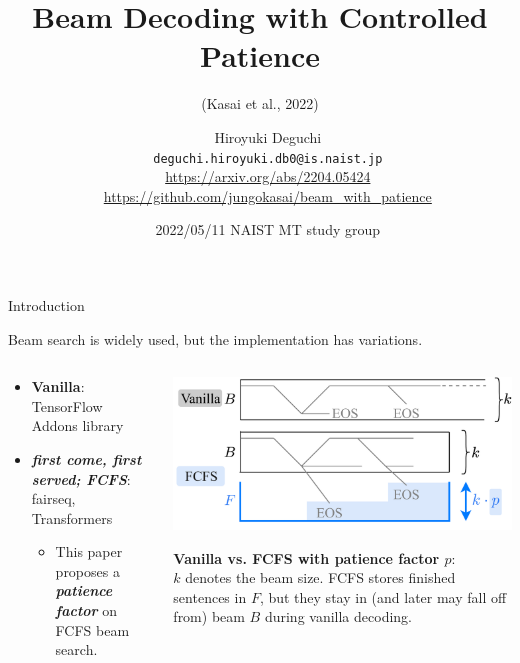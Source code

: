 \documentclass[t, unicode, 12pt, xdvipdfmx, aspectratio=169, bxjsarticle]{beamer}
\author{\mbox{\lower2.0pt\hbox{\materials}}~ Hiroyuki Deguchi \\ \mbox{\lower2.0pt\hbox{\materials}}~ \texttt{deguchi.hiroyuki.db0@is.naist.jp} \\ \raise0.5pt\hbox{\octicons}~ \url{https://arxiv.org/abs/2204.05424} \\ \raise0.5pt\hbox{\octicons}~ \url{https://github.com/jungokasai/beam_with_patience}}
\date{\mbox{\lower2.0pt\hbox{\materials}}~ 2022/05/11 NAIST MT study group}
\title{Beam Decoding with Controlled Patience}
\subtitle{(Kasai et al., 2022)}
\institute{}
\begin{document}
\maketitle

\begin{frame}[label={sec:orgd1eb8cc}]{Introduction}
\begin{block}{Beam search is widely used, but the implementation has variations.}
\begin{columns}
\begin{column}{0.5\columnwidth}
\begin{itemize}
\item \textbf{Vanilla}: TensorFlow Addons library
\item \textbf{\textit{first come, first served; FCFS}}: fairseq, Transformers
\begin{itemize}
\item This paper proposes a \textbf{\textit{patience factor}} on FCFS beam search.
\end{itemize}
\end{itemize}
\end{column}

\begin{column}{0.5\columnwidth}
\begin{center}
\includegraphics[width=1.0\linewidth]{./figure/contrast_fig.pdf}
\end{center}

\footnotesize \textbf{Vanilla vs. FCFS with patience factor $p$}: \\
\(k\) denotes the beam size. FCFS stores finished sentences in \(F\), but they stay in (and later may fall off from) beam \(B\) during vanilla decoding.
\end{column}
\end{columns}
\end{block}
\end{frame}
\end{document}
